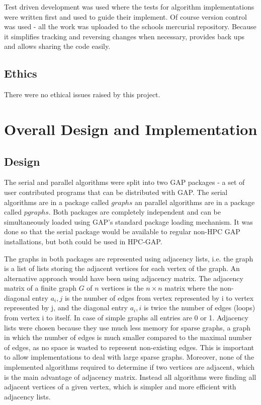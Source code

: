 \documentclass{report}
\theoremstyle{plain}
\theoremstyle{definition}
\theoremstyle{remark}
\begin{document}
Test driven development was used where the tests for algorithm implementations were written first and used to guide their implement. Of course version control was used - all the work was uploaded to the schools mercurial repository. Because it simplifies tracking and reversing changes when necessary, provides back ups and allows sharing the code easily.

\section{Ethics}

There were no ethical issues raised by this project.

\chapter{Overall Design and Implementation}

\section{Design}

The serial and parallel algorithms were split into two GAP packages - a set of user contributed programs that can be distributed with GAP. The serial algorithms are in a package called $graphs$ an parallel algorithms are in a package called $pgraphs$. Both packages are completely independent and can be simultaneously loaded using GAP's standard package loading mechanism. It was done so that the serial package would be available to regular non-HPC GAP installations, but both could be used in HPC-GAP.

The graphs in both packages are represented using adjacency lists, i.e. the graph is a list of lists storing the adjacent vertices for each vertex of the graph. An alternative approach would have been using adjacency matrix. The adjacency matrix of a finite graph $G$ of $n$ vertices is the $n\times n$ matrix where the non-diagonal entry $a_i,j$ is the number of edges from vertex represented by i to vertex represented by j, and the diagonal entry $a_i,i$ is twice the number of edges (loops) from vertex i to itself. In case of simple graphs all entries are 0 or 1. Adjacency lists were chosen because they use much less memory for sparse graphs, a graph in which the number of edges is much smaller compared to the maximal number of edges, as no space is wasted to represent non-existing edges. This is important to allow implementations to deal with large sparse graphs. Moreover, none of the implemented algorithms required to determine if two vertices are adjacent, which is the main advantage of adjacency matrix. Instead all algorithms were finding all adjacent vertices of a given vertex, which is simpler and more efficient with adjacency lists.
\end{document}
